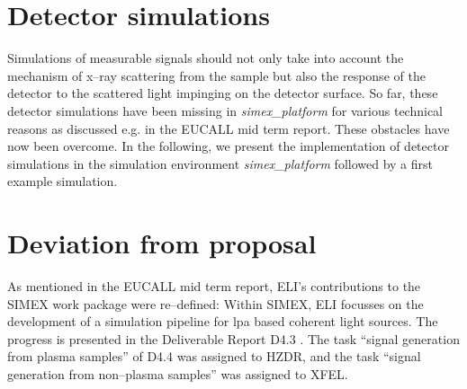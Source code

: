 \documentclass[10pt]{scrartcl}
\begin{document}
\section{Detector simulations\label{sec:detector_simulations}}
Simulations of measurable signals should not only take into account the
mechanism of x--ray scattering from the sample but also the response of the
detector to the scattered light impinging on the detector surface. So far, these
detector simulations have been missing in \textit{simex\_platform} for various technical reasons as
discussed e.g. in the EUCALL mid term report. These obstacles have now been
overcome. In the following, we present the implementation of detector
simulations in the simulation environment \textit{simex\_platform} followed by a first example simulation.




\appendix
\section{Deviation from proposal}
As mentioned in the EUCALL mid term report, ELI's contributions to the SIMEX
work package were
re--defined: Within SIMEX, ELI focusses on the development of a simulation
pipeline for \gls{lpa} based coherent light sources. The progress is presented
in the Deliverable Report D4.3 \cite{EUCALL_SIMEX_D4.3}. The task ``signal
generation from plasma samples'' of D4.4  was assigned to HZDR, and the task
``signal generation from non--plasma samples'' was assigned to XFEL.

\FloatBarrier
\printbibliography[notkeyword=submitted, notkeyword=inpreparation, notkeyword=report, notkeyword=zenodo, title={Journal articles}]
%
\printbibliography[keyword=submitted, title={Submitted articles}]
%
\printbibliography[keyword=inpreparation, title={Articles in preparation}]
%
\printbibliography[keyword=eucall, keyword=report, title={Project reports}]
%
\printbibliography[keyword=zenodo, title={Datasets}]

\end{document}
